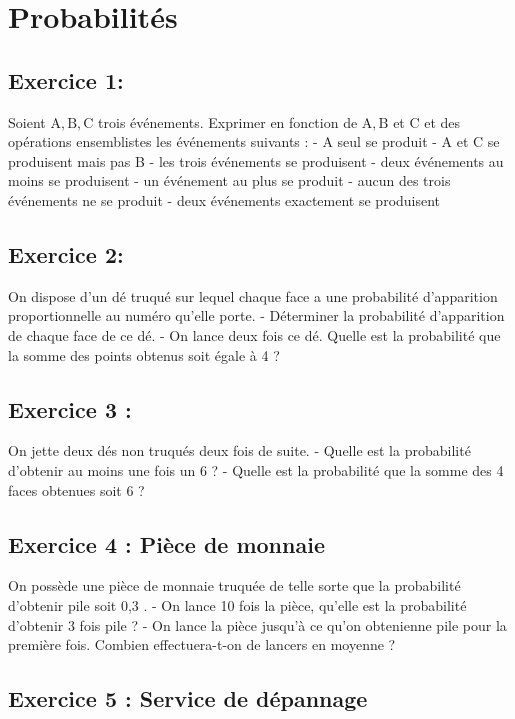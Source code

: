 \chapter{Probabilités}

\section*{Exercice 1:}

Soient \(\mathrm{A}, \mathrm{B}, \mathrm{C}\) trois événements. Exprimer en fonction de \(\mathrm{A}, \mathrm{B}\) et C et des opérations ensemblistes les événements suivants :
- A seul se produit
- A et C se produisent mais pas B
- les trois événements se produisent
- deux événements au moins se produisent
- un événement au plus se produit
- aucun des trois événements ne se produit
- deux événements exactement se produisent

\section*{Exercice 2:}

On dispose d'un dé truqué sur lequel chaque face a une probabilité d'apparition proportionnelle au numéro qu'elle porte.
- Déterminer la probabilité d'apparition de chaque face de ce dé.
- On lance deux fois ce dé. Quelle est la probabilité que la somme des points obtenus soit égale à 4 ?

\section*{Exercice 3 :}

On jette deux dés non truqués deux fois de suite.
- Quelle est la probabilité d'obtenir au moins une fois un 6 ?
- Quelle est la probabilité que la somme des 4 faces obtenues soit 6 ?

\section*{Exercice 4 : Pièce de monnaie}

On possède une pièce de monnaie truquée de telle sorte que la probabilité d'obtenir pile soit 0,3 .
- On lance 10 fois la pièce, qu'elle est la probabilité d'obtenir 3 fois pile ?
- On lance la pièce jusqu'à ce qu'on obtenienne pile pour la première fois. Combien effectuera-t-on de lancers en moyenne ?

\section*{Exercice 5 : Service de dépannage}

